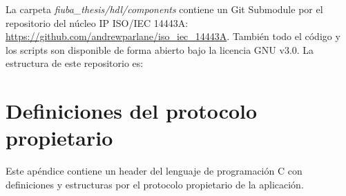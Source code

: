 \documentclass[a4paper, twoside, 11pt]{report}
\begin{document}
La carpeta \textit{fiuba\_thesis/hdl/components} contiene un Git Submodule por el repositorio del núcleo IP ISO/IEC 14443A: \url{https://github.com/andrewparlane/iso_iec_14443A}. También todo el código y los scripts son disponible de forma abierto bajo la licencia GNU v3.0. La estructura de este repositorio es:

\vspace{1em}


\newpage
\chapter{Definiciones del protocolo propietario}
\label{appendix:protocol_defs}

Este apéndice contiene un header del lenguaje de programación C con definiciones y estructuras por el protocolo propietario de la aplicación.
\end{document}
